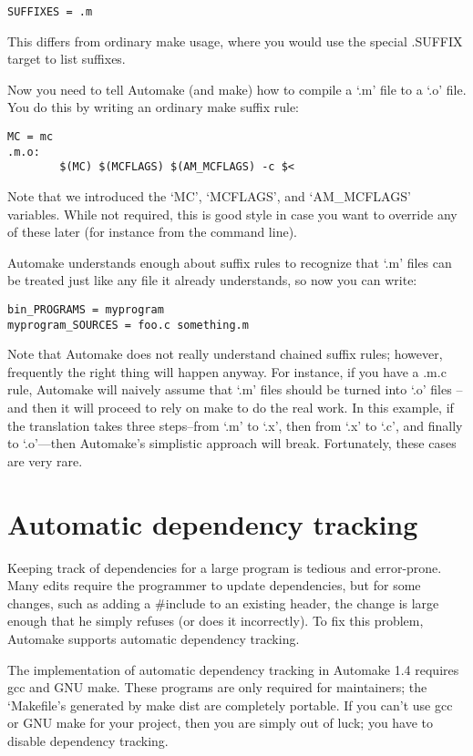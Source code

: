 \begin{Verbatim}[frame=single]
SUFFIXES = .m
\end{Verbatim}

This differs from ordinary make usage, where you would use the special .SUFFIX target to list suffixes.

Now you need to tell Automake (and make) how to compile a `.m' file to a `.o' file. You do this by writing an ordinary make suffix rule: 

\begin{Verbatim}[frame=single]
MC = mc
.m.o:
        $(MC) $(MCFLAGS) $(AM_MCFLAGS) -c $<
\end{Verbatim}

Note that we introduced the `MC', `MCFLAGS', and `AM\_{}MCFLAGS' variables. While not required, this is good style in case you want to override any of these later (for instance from the command line).

Automake understands enough about suffix rules to recognize that `.m' files can be treated just like any file it already understands, so now you can write: 

\begin{Verbatim}[frame=single]
bin_PROGRAMS = myprogram
myprogram_SOURCES = foo.c something.m
\end{Verbatim}

Note that Automake does not really understand chained suffix rules; however, frequently the right thing will happen anyway. For instance, if you have a .m.c rule, Automake will naively assume that `.m' files should be turned into `.o' files -- and then it will proceed to rely on make to do the real work. In this example, if the translation takes three steps--from `.m' to `.x', then from `.x' to `.c', and finally to `.o'---then Automake's simplistic approach will break. Fortunately, these cases are very rare.

\section{Automatic dependency tracking}

Keeping track of dependencies for a large program is tedious and error-prone.
Many edits require the programmer to update dependencies, but for some changes,
such as adding a \#include to an existing header, the change is large enough 
that he simply refuses (or does it incorrectly). To fix this problem, Automake supports automatic dependency tracking.

The implementation of automatic dependency tracking in Automake 1.4 requires gcc and GNU make. These programs are only required for maintainers; the `Makefile's generated by make dist are completely portable. If you can't use gcc or GNU make for your project, then you are simply out of luck; you have to disable dependency tracking.

